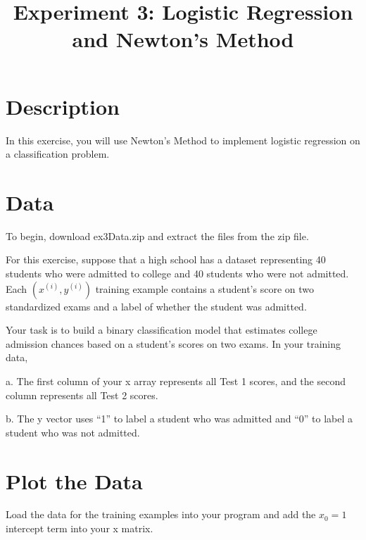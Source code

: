 \documentclass[10pt,a4paper]{article}
\begin{document}
\title{Experiment 3: Logistic Regression and Newton's Method}

\maketitle
  
\section{Description}
%
  In this exercise, you will use Newton's Method to implement logistic regression on a classification problem.



\section{Data}
%
  To begin, download ex3Data.zip and extract the files from the zip file.

  For this exercise, suppose that a high school has a dataset representing 40 students who were admitted to college and 40 students who were not admitted. Each $(x^{(i)}, y^{(i)})$ training example contains a student's score on two standardized exams and a label of whether the student was admitted.

  Your task is to build a binary classification model that estimates college admission chances based on a student's scores on two exams. In your training data,

  a. The first column of your x array represents all Test 1 scores, and the second column represents all Test 2 scores.

  b. The y vector uses ``1'' to label a student who was admitted and ``0'' to label a student who was not admitted.




\section{Plot the Data}
%
  Load the data for the training examples into your program and add the $x_0 = 1$ intercept term into your x matrix.
\end{document}
